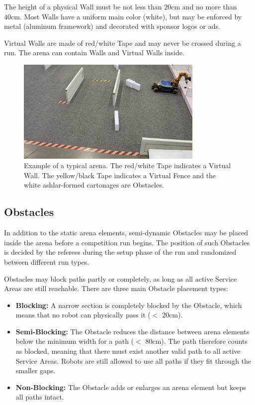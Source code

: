 The height of a physical Wall must be not less than $20\si{\centi\meter}$ and no more than $40\si{\centi\meter}$.
Most Walls have a uniform main color (white), but may be enforced by metal (aluminum framework) and decorated with sponsor logos or ads.

Virtual Walls are made of red/white Tape and may never be crossed during a run. The arena can contain Walls and Virtual Walls inside.

\begin{figure} [h!]
\centering
\includegraphics[width= 0.8\textwidth ]{./images/general_rules/barrier_tapes_in_china15.jpg}
\caption{Example of a typical arena. The red/white Tape indicates a Virtual Wall. The yellow/black Tape indicates a Virtual Fence and the white ashlar-formed cartonages are Obstacles.}
\label{fig:walls_and_virt_walls}
\end{figure}

\subsection{Obstacles}
\label{subsec: Obstacles}

In addition to the static arena elements, semi-dynamic Obstacles may be placed inside the arena before a competition run begins. 
The position of such Obstacles is decided by the referees during the setup phase of the run and randomized between different run types.

Obstacles may block paths partly or completely, as long as all active Service Areas are still reachable.
There are three main Obstacle placement types:

\begin{itemize}
\item \textbf{Blocking:} 
A narrow section is completely blocked by the Obstacle, which means that no robot can physically pass it ($<$ $20\si{\centi\meter}$).

\item \textbf{Semi-Blocking:} 
The Obstacle reduces the distance between arena elements below the minimum width for a path ($<$ $80\si{\centi\meter}$). The path therefore counts as blocked, meaning that there must exist another valid path to all active Service Areas. Robots are still allowed to use all paths if they fit through the smaller gaps.

\item \textbf{Non-Blocking:}
The Obstacle adds or enlarges an arena element but keeps all paths intact.
\end{itemize}

